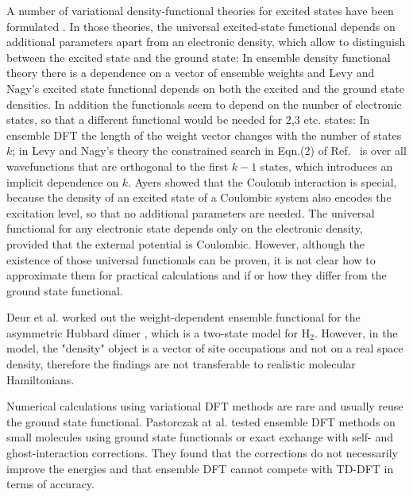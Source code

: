 \documentclass[journal=jacsat,manuscript=article]{achemso}
\begin{document}
A number of variational density-functional theories for excited states have been formulated \cite{Theophilou1979,Gross1988ReyleighRitz,Levy1999}.
In those theories, the universal excited-state functional depends on additional parameters apart from an electronic density,
which allow to distinguish between the excited state and the ground state: In ensemble density functional theory
\cite{Gross1988ReyleighRitz,Gross1988EnsembleDFT} there is a dependence on a vector of ensemble weights
and Levy and Nagy's excited state functional \cite{Levy1999} depends on both the excited and the ground state densities.
In addition the functionals seem to depend on
the number of electronic states, so that a different functional would be needed for 2,3 etc. states:
In ensemble DFT the length of the weight vector changes with the number of states $k$;
in Levy and Nagy's theory the constrained search in Eqn.(2) of Ref.~\cite{Levy1999} is over all wavefunctions that are orthogonal
to the first $k-1$ states, which introduces an implicit dependence on $k$.
Ayers showed that the Coulomb interaction is special, because the density of an excited state of a Coulombic system also encodes
the excitation level, so that no additional parameters are needed. \cite{Ayers2012} The universal functional for
any electronic state depends only on the electronic density, provided that the external potential is Coulombic. \cite{Ayers2012}
However, although the existence of those universal functionals can be proven,
it is not clear how to approximate them for practical calculations
and if or how they differ from the ground state functional.

Deur et al. worked out the weight-dependent ensemble functional for the asymmetric Hubbard dimer \cite{Deur2017},
which is a two-state model for H$_2$. However, in the model, the "density" object is a vector of site occupations
and not on a real space density, therefore the findings are not transferable to realistic molecular Hamiltonians.


Numerical calculations using variational DFT methods are rare and usually reuse the ground state functional.
Pastorczak at al. tested ensemble DFT methods on small molecules using ground state functionals or exact exchange
with self- and ghost-interaction corrections. \cite{Pastorczak2014} They found that the corrections
do not necessarily improve the energies and that ensemble DFT cannot compete with TD-DFT in terms of accuracy. \cite{Pastorczak2014}
\end{document}
